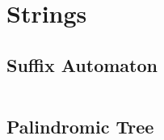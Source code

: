 \section{Strings}

\subsection{Suffix Automaton}

\inputminted{cpp}{code/minimalist_tomato_struct.cpp}

\subsection{Palindromic Tree}

\inputminted{cpp}{code/palindromic_tree.cpp}
